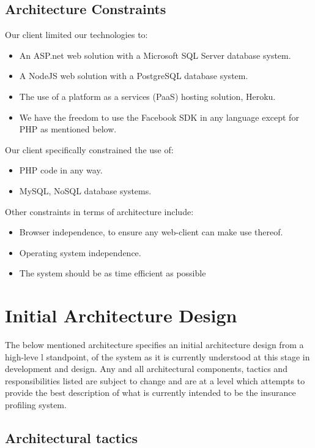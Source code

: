 \documentclass{article}
\begin{document}
	\subsection{Architecture Constraints}
	Our client limited our technologies to:
	\begin{itemize}
		\item An ASP.net web solution with a Microsoft SQL Server database system.
		\item A NodeJS web solution with a PostgreSQL database system.
		\item The use of a platform as a services (PaaS) hosting solution, Heroku.
		\item We have the freedom to use the Facebook SDK in any language except for PHP as mentioned below.
	\end{itemize}
	Our client specifically constrained the use of:
		\begin{itemize}
		\item PHP code in any way.
		\item MySQL, NoSQL database systems.
		\end{itemize}
	Other constraints in terms of architecture include:
	\begin{itemize}
		\item Browser independence, to ensure any web-client can make use thereof.
		\item Operating system independence.
		\item The system should be as time efficient as possible
		\end{itemize}
\pagebreak

	\section{Initial Architecture Design}

	The below mentioned architecture specifies an initial architecture design from a high-leve l standpoint, of the system as it is currently understood at this stage in development and design. Any and all architectural components, tactics and responsibilities listed are subject to change and are at a level which attempts to provide the best description of what is currently intended to be the insurance profiling system.

	\subsection{Architectural tactics}\label{subsec:tactics}
\end{document}
